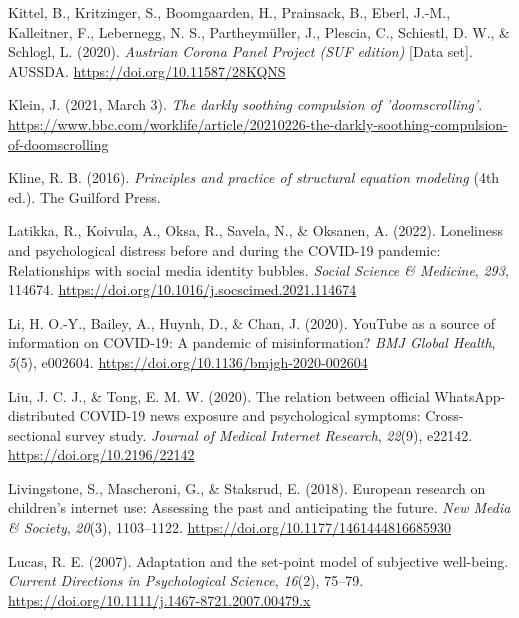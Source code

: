 \documentclass[
  man,mask]{apa7}
\newlength{\cslhangindent}
\newlength{\cslentryspacingunit} %
\newenvironment{CSLReferences}[2] %
 {%
  \setlength{\parindent}{0pt}
  \ifodd #1
  \let\oldpar\par
  \def\par{\hangindent=\cslhangindent\oldpar}
  \fi
  \setlength{\parskip}{#2\cslentryspacingunit}
 }%
 {}
\begin{document}
\begin{CSLReferences}{1}{0}
\leavevmode{}%
Kittel, B., Kritzinger, S., Boomgaarden, H., Prainsack, B., Eberl, J.-M., Kalleitner, F., Lebernegg, N. S., Partheymüller, J., Plescia, C., Schiestl, D. W., \& Schlogl, L. (2020). \emph{Austrian {Corona Panel Project} ({SUF} edition)} {[}Data set{]}. {AUSSDA}. \url{https://doi.org/10.11587/28KQNS}

\leavevmode{}%
Klein, J. (2021, March 3). \emph{The darkly soothing compulsion of 'doomscrolling'}. \url{https://www.bbc.com/worklife/article/20210226-the-darkly-soothing-compulsion-of-doomscrolling}

\leavevmode{}%
Kline, R. B. (2016). \emph{Principles and practice of structural equation modeling} (4th ed.). {The Guilford Press}.

\leavevmode{}%
Latikka, R., Koivula, A., Oksa, R., Savela, N., \& Oksanen, A. (2022). Loneliness and psychological distress before and during the {COVID-19} pandemic: {Relationships} with social media identity bubbles. \emph{Social Science \& Medicine}, \emph{293}, 114674. \url{https://doi.org/10.1016/j.socscimed.2021.114674}

\leavevmode{}%
Li, H. O.-Y., Bailey, A., Huynh, D., \& Chan, J. (2020). {YouTube} as a source of information on {COVID-19}: A pandemic of misinformation? \emph{BMJ Global Health}, \emph{5}(5), e002604. \url{https://doi.org/10.1136/bmjgh-2020-002604}

\leavevmode{}%
Liu, J. C. J., \& Tong, E. M. W. (2020). The relation between official {WhatsApp-distributed COVID-19} news exposure and psychological symptoms: Cross-sectional survey study. \emph{Journal of Medical Internet Research}, \emph{22}(9), e22142. \url{https://doi.org/10.2196/22142}

\leavevmode{}%
Livingstone, S., Mascheroni, G., \& Staksrud, E. (2018). European research on children's internet use: {Assessing} the past and anticipating the future. \emph{New Media \& Society}, \emph{20}(3), 1103--1122. \url{https://doi.org/10.1177/1461444816685930}

\leavevmode{}%
Lucas, R. E. (2007). Adaptation and the set-point model of subjective well-being. \emph{Current Directions in Psychological Science}, \emph{16}(2), 75--79. \url{https://doi.org/10.1111/j.1467-8721.2007.00479.x}


\end{CSLReferences}
\end{document}
